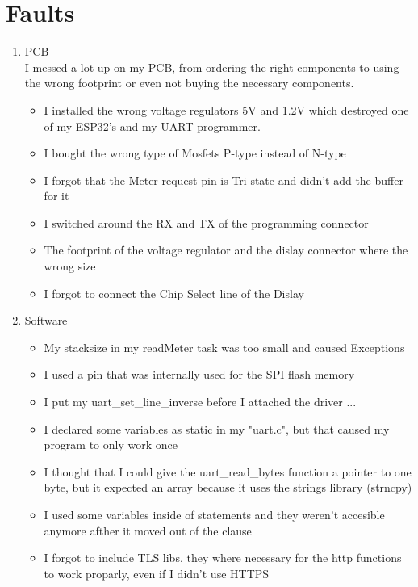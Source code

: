 \documentclass[a4paper,twoside, 12pt]{report}
\theoremstyle{break}
\begin{document}
\section{Faults}
\begin{enumerate}
\item PCB\\
	I messed a lot up on my PCB, from ordering the right components to using the wrong footprint or even not buying the necessary components.\\
	\begin{itemize}
	\item I installed the wrong voltage regulators 5V and 1.2V which destroyed one of my ESP32's and my UART programmer.
	\item I bought the wrong type of Mosfets P-type instead of N-type
	\item I forgot that the Meter request pin is Tri-state and didn't add the buffer for it
	\item I switched around the RX and TX of the programming connector
	\item The footprint of the voltage regulator and the dislay connector where the wrong size
	\item I forgot to connect the Chip Select line of the Dislay
	\end{itemize}
	\item Software
	\begin{itemize}
		\item My stacksize in my readMeter task was too small and caused Exceptions
		\item I used a pin that was internally used for the SPI flash memory
		\item I put my uart\_set\_line\_inverse before I attached the driver ...
		\item I declared some variables as static in my "uart.c", but that caused my program to only work once
		\item I thought that I could give the uart\_read\_bytes function a pointer to one byte, but it expected an array because it uses the strings library (strncpy)
		\item I used some variables inside of statements and they weren't accesible anymore afther it moved out of the clause
		\item I forgot to include TLS libs, they where necessary for the http functions to work proparly, even if I didn't use HTTPS
	\end{itemize}
\end{enumerate}
\vfill
\eject
\end{document}
